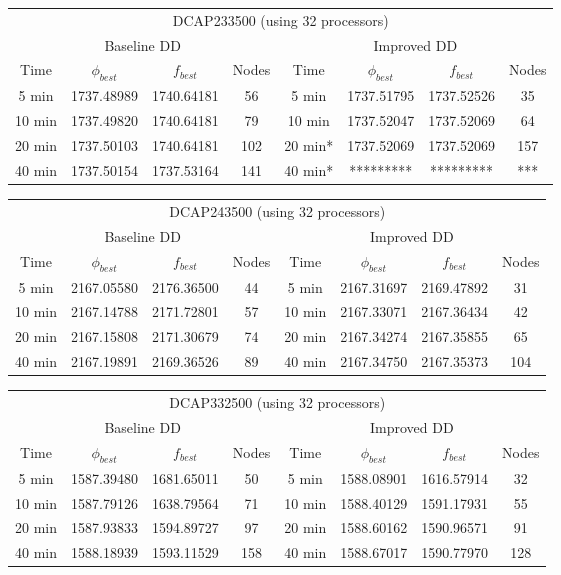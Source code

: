 \begin{footnotesize}
\begin{tabular}{cccc|cccc}
\multicolumn{8}{c}{DCAP233500 (using 32 processors)}\\
\multicolumn{4}{c}{Baseline DD} & \multicolumn{4}{c}{Improved DD}\\
Time & $\phi_{best}$ & $f_{best}$ & Nodes & Time & $\phi_{best}$ & $f_{best}$ & Nodes \\
\hline
5 min & 1737.48989 & 1740.64181 & 56 & 5 min & 1737.51795 & 1737.52526 & 35 \\
10 min & 1737.49820 & 1740.64181 & 79 & 10 min & 1737.52047 & 1737.52069 & 64 \\
20 min & 1737.50103 & 1740.64181 & 102 & 20 min* & 1737.52069 & 1737.52069 & 157 \\
40 min & 1737.50154 & 1737.53164 & 141 & 40 min* & ********* & ********* & *** 
\end{tabular}

\medskip
\begin{tabular}{cccc|cccc}
\multicolumn{8}{c}{DCAP243500 (using 32 processors)}\\
\multicolumn{4}{c}{Baseline DD} & \multicolumn{4}{c}{Improved DD}\\
Time & $\phi_{best}$ & $f_{best}$ & Nodes & Time & $\phi_{best}$ & $f_{best}$ & Nodes \\
\hline
5 min &   2167.05580 & 2176.36500 & 44 & 5 min & 2167.31697 & 2169.47892 & 31 \\
10 min & 2167.14788 & 2171.72801 & 57 & 10 min & 2167.33071 & 2167.36434 & 42 \\
20 min & 2167.15808 & 2171.30679 & 74 & 20 min & 2167.34274 & 2167.35855 & 65\\
40 min & 2167.19891 & 2169.36526 & 89 & 40 min & 2167.34750 & 2167.35373 & 104 
\end{tabular}

\medskip
\begin{tabular}{cccc|cccc}
\multicolumn{8}{c}{DCAP332500 (using 32 processors)}\\
\multicolumn{4}{c}{Baseline DD} & \multicolumn{4}{c}{Improved DD}\\
Time & $\phi_{best}$ & $f_{best}$ & Nodes & Time & $\phi_{best}$ & $f_{best}$ & Nodes \\
\hline
5 min &   1587.39480 & 1681.65011 & 50 & 5 min & 1588.08901 & 1616.57914 & 32 \\
10 min & 1587.79126 & 1638.79564 & 71 & 10 min & 1588.40129 & 1591.17931 & 55 \\
20 min & 1587.93833 & 1594.89727 & 97 & 20 min & 1588.60162 & 1590.96571 & 91\\
40 min & 1588.18939 & 1593.11529 & 158 & 40 min & 1588.67017 & 1590.77970 & 128 
\end{tabular}


\end{footnotesize}
